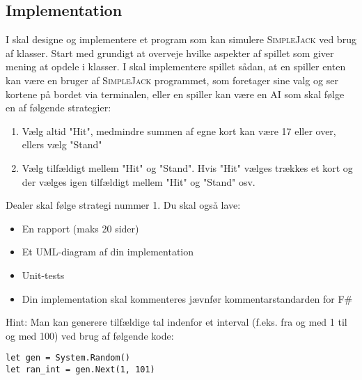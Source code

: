 \documentclass[12pt]{article}
\newcommand{\sbl}{\textsc{SimpleJack }}
\begin{document}
\subsection*{Implementation}
I skal designe og implementere et program som kan simulere \sbl ved brug af klasser. 
Start med grundigt at overveje hvilke aspekter af spillet
som giver mening at opdele i klasser. I skal implementere spillet sådan, at en spiller enten kan være en bruger af
\sbl programmet, som foretager sine valg og ser kortene på bordet via terminalen, eller en spiller kan være en AI som
skal følge en af følgende strategier:
\begin{enumerate}
\item Vælg altid "Hit", medmindre summen af egne kort kan være 17 eller over, ellers vælg "Stand"
\item Vælg tilfældigt mellem "Hit" og "Stand". Hvis "Hit" vælges trækkes et kort og der vælges igen tilfældigt mellem "Hit"
og "Stand" osv.
\end{enumerate}
Dealer skal følge strategi nummer 1.
Du skal også lave:
\begin{itemize}
\item En rapport (maks 20 sider)
\item Et UML-diagram af din implementation
\item Unit-tests
\item Din implementation skal kommenteres jævnfør kommentarstandarden for F\#
\end{itemize}
Hint: Man kan generere tilfældige tal indenfor et interval (f.eks. fra og med 1 til og med 100) ved brug af følgende kode:
\begin{lstlisting}[frame=none]
let gen = System.Random()
let ran_int = gen.Next(1, 101)
\end{lstlisting}
\end{document}
